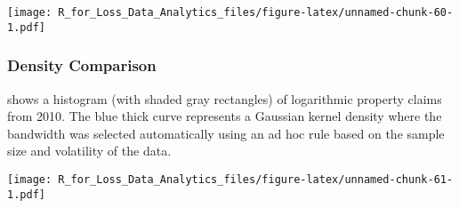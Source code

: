 \documentclass[]{book}
\newenvironment{Shaded}{\begin{snugshade}}{\end{snugshade}}
\newcommand{\KeywordTok}[1]{\textcolor[rgb]{0.13,0.29,0.53}{\textbf{#1}}}
\newcommand{\DataTypeTok}[1]{\textcolor[rgb]{0.13,0.29,0.53}{#1}}
\newcommand{\DecValTok}[1]{\textcolor[rgb]{0.00,0.00,0.81}{#1}}
\newcommand{\FloatTok}[1]{\textcolor[rgb]{0.00,0.00,0.81}{#1}}
\newcommand{\StringTok}[1]{\textcolor[rgb]{0.31,0.60,0.02}{#1}}
\newcommand{\CommentTok}[1]{\textcolor[rgb]{0.56,0.35,0.01}{\textit{#1}}}
\newcommand{\OtherTok}[1]{\textcolor[rgb]{0.56,0.35,0.01}{#1}}
\newcommand{\OperatorTok}[1]{\textcolor[rgb]{0.81,0.36,0.00}{\textbf{#1}}}
\newcommand{\NormalTok}[1]{#1}
\theoremstyle{definition}
\theoremstyle{definition}
\theoremstyle{definition}
\theoremstyle{remark}
\begin{document}
\texttt{[image: R\_for\_Loss\_Data\_Analytics\_files/figure-latex/unnamed-chunk-60-1.pdf]}

\subsubsection{Density Comparison}\label{density-comparison}

shows a histogram (with shaded gray rectangles) of logarithmic property
claims from 2010. The blue thick curve represents a Gaussian kernel
density where the bandwidth was selected automatically using an ad hoc
rule based on the sample size and volatility of the data.

\begin{Shaded}
\end{Shaded}

\texttt{[image: R\_for\_Loss\_Data\_Analytics\_files/figure-latex/unnamed-chunk-61-1.pdf]}

\begin{Shaded}
\end{Shaded}
\end{document}
